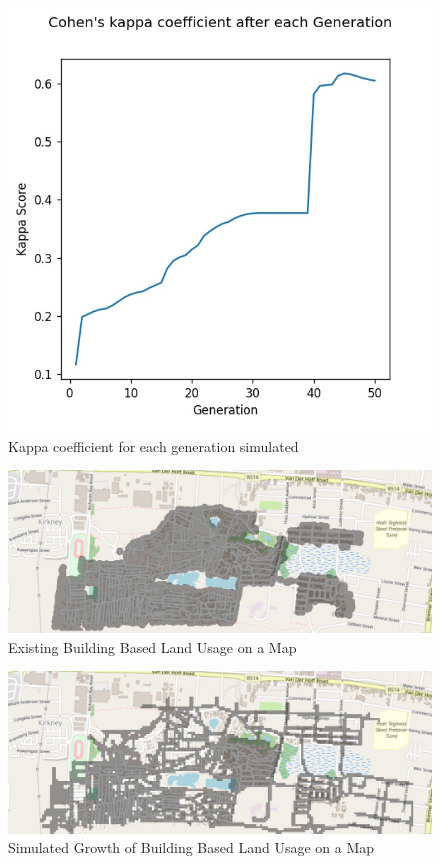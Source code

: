 \begin{figure}[H]
\centering
\includegraphics[scale=0.7]{Figures/Chapter4/scoresFigure}
\caption{Kappa coefficient for each generation simulated}
\end{figure}

\begin{figure}[H]
\centering
\includegraphics[scale=0.3,angle=90]{Figures/Chapter4/Actual}
\caption{Existing Building Based Land Usage on a Map}
\end{figure}

\begin{figure}[H]
\centering
\includegraphics[scale=0.3,angle=90]{Figures/Chapter4/Simulated}
\caption{Simulated Growth of Building Based Land Usage on a Map}
\end{figure}